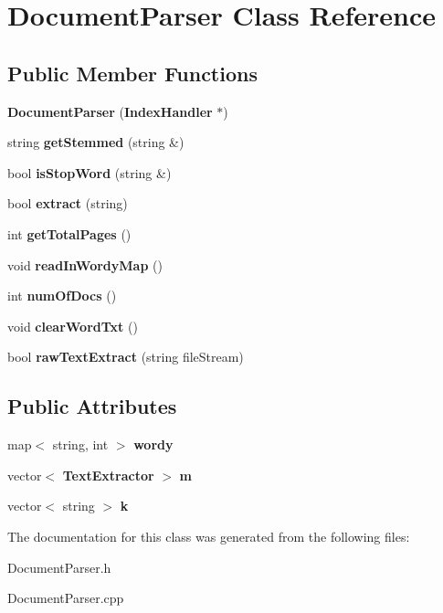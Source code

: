 \section{Document\+Parser Class Reference}
\label{class_document_parser}
\subsection*{Public Member Functions}
\begin{DoxyCompactItemize}
\item 
{\bfseries Document\+Parser} ({\bf Index\+Handler} $\ast$)\label{class_document_parser_ad2596ffd31e82743ba810eb3a5095f86}

\item 
string {\bfseries get\+Stemmed} (string \&)\label{class_document_parser_ac615691a621d8159f6880da3d08ee031}

\item 
bool {\bfseries is\+Stop\+Word} (string \&)\label{class_document_parser_a10dbb34d6b29a5f80040448f4c83ae4a}

\item 
bool {\bfseries extract} (string)\label{class_document_parser_a329d995e1400b17cb80a28ae2aa71404}

\item 
int {\bfseries get\+Total\+Pages} ()\label{class_document_parser_ad0bcd4d507e22a83d5f024a11e4a42be}

\item 
void {\bfseries read\+In\+Wordy\+Map} ()\label{class_document_parser_aa2fd3a356259a1adeb412badd8c6c104}

\item 
int {\bfseries num\+Of\+Docs} ()\label{class_document_parser_ac7d4610d5c6f32a1ee8a7bb89cee8d02}

\item 
void {\bfseries clear\+Word\+Txt} ()\label{class_document_parser_a7372989e6304126c8b6e86e8d92fae38}

\item 
bool {\bfseries raw\+Text\+Extract} (string file\+Stream)\label{class_document_parser_a236ffba82676ea47160607f794e8224e}

\end{DoxyCompactItemize}
\subsection*{Public Attributes}
\begin{DoxyCompactItemize}
\item 
map$<$ string, int $>$ {\bfseries wordy}\label{class_document_parser_a951ea170c5ba3efbd34363ac1a40ccc9}

\item 
vector$<$ {\bf Text\+Extractor} $>$ {\bfseries m}\label{class_document_parser_a10f2fd6d41e587808769c72e3cce185a}

\item 
vector$<$ string $>$ {\bfseries k}\label{class_document_parser_a92b189d555e909be442b36b7d3aa36fc}

\end{DoxyCompactItemize}


The documentation for this class was generated from the following files\+:\begin{DoxyCompactItemize}
\item 
Document\+Parser.\+h\item 
Document\+Parser.\+cpp\end{DoxyCompactItemize}
